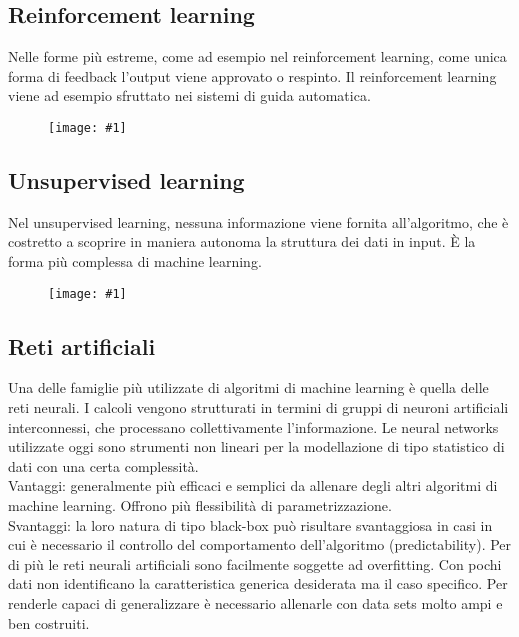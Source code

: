 \documentclass[8pt,a4paper]{article}
\newcommand{\f}[1]{
      \begin{figure}[H]
        \center
      \texttt{[image: \#1]}
      \end{figure}
}
\begin{document}
\begin{multicols}{5}
    \subsection{Reinforcement learning}
    Nelle forme più estreme, come ad esempio nel reinforcement learning, come unica
    forma di feedback l’output viene approvato o respinto. Il reinforcement learning
    viene ad esempio sfruttato nei sistemi di guida automatica.
    \f{ReinforcementLearning}
    
    \subsection{Unsupervised learning}
    Nel unsupervised learning, nessuna informazione viene fornita all’algoritmo, che
    è costretto a scoprire in maniera autonoma la struttura dei dati in input. È la
    forma più complessa di machine learning.
    \f{UnsupervisedLearning}
    
    \subsection{Reti artificiali}
    Una delle famiglie più utilizzate di algoritmi di machine learning è quella delle
    reti neurali. I calcoli vengono strutturati in termini di gruppi di neuroni artificiali
    interconnessi, che processano collettivamente l’informazione. Le neural networks
    utilizzate oggi sono strumenti non lineari per la modellazione di tipo statistico
    di dati con una certa complessità.\\
    Vantaggi: generalmente più efficaci e semplici da allenare degli altri algoritmi
    di machine learning. Offrono più flessibilità di parametrizzazione.\\
    Svantaggi: la loro natura di tipo black-box può risultare svantaggiosa in casi in cui
    è necessario il controllo del comportamento dell’algoritmo (predictability). Per di
    più le reti neurali artificiali sono facilmente soggette ad overfitting. Con pochi dati
    non identificano la caratteristica generica desiderata ma il caso specifico.
    Per renderle capaci di generalizzare è necessario allenarle con data sets molto ampi e ben costruiti.
    

\end{multicols}
\end{document}
